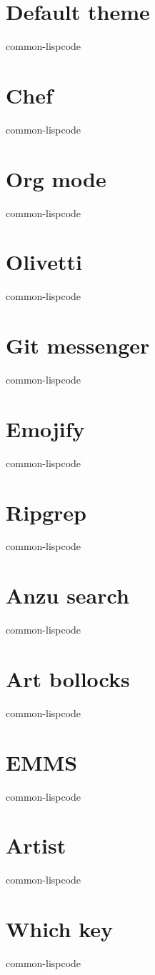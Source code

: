 \documentclass[11pt]{article}
\begin{document}
\section{Default theme}
\label{sec:org3216c04}
common-lispcode
\section{Chef}
\label{sec:orgf9d8ca5}
common-lispcode
\section{Org mode}
\label{sec:orgbda008e}
common-lispcode
\section{Olivetti}
\label{sec:org1c89bed}
common-lispcode
\section{Git messenger}
\label{sec:orgebeca91}
common-lispcode
\section{Emojify}
\label{sec:org5706163}
common-lispcode
\section{Ripgrep}
\label{sec:orga3597d4}
common-lispcode
\section{Anzu search}
\label{sec:org902158c}
common-lispcode
\section{Art bollocks}
\label{sec:org78481df}
common-lispcode
\section{EMMS}
\label{sec:org85c5664}
common-lispcode
\section{Artist}
\label{sec:orgb92d624}
common-lispcode
\section{Which key}
\label{sec:orge7c6c43}
common-lispcode
\end{document}
